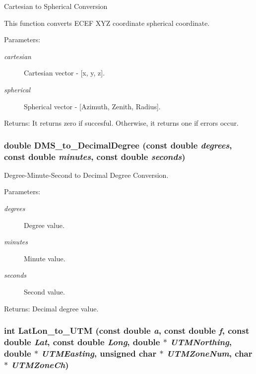 Cartesian to Spherical Conversion 

This function converts ECEF XYZ coordinate spherical coordinate.

\begin{Desc}
\item[Parameters:]
\begin{description}
\item[{\em cartesian}]Cartesian vector - \mbox{[}x, y, z\mbox{]}. \item[{\em spherical}]Spherical vector - \mbox{[}Azimuth, Zenith, Radius\mbox{]}.\end{description}
\end{Desc}
\begin{Desc}
\item[Returns:]It returns zero if succesful. Otherwise, it returns one if errors occur. \end{Desc}
\hypertarget{group__Coordinate_g9e353934d40cb8dc6e102003b945acdd}{
\subsubsection[DMS\_\-to\_\-DecimalDegree]{\setlength{\rightskip}{0pt plus 5cm}double DMS\_\-to\_\-DecimalDegree (const double {\em degrees}, \/  const double {\em minutes}, \/  const double {\em seconds})}}
\label{group__Coordinate_g9e353934d40cb8dc6e102003b945acdd}


Degree-Minute-Second to Decimal Degree Conversion. 

\begin{Desc}
\item[Parameters:]
\begin{description}
\item[{\em degrees}]Degree value. \item[{\em minutes}]Minute value. \item[{\em seconds}]Second value.\end{description}
\end{Desc}
\begin{Desc}
\item[Returns:]Decimal degree value. \end{Desc}
\hypertarget{group__Coordinate_g6c1e48485dd1ac536a1545f7b62c82df}{
\subsubsection[LatLon\_\-to\_\-UTM]{\setlength{\rightskip}{0pt plus 5cm}int LatLon\_\-to\_\-UTM (const double {\em a}, \/  const double {\em f}, \/  const double {\em Lat}, \/  const double {\em Long}, \/  double $\ast$ {\em UTMNorthing}, \/  double $\ast$ {\em UTMEasting}, \/  unsigned char $\ast$ {\em UTMZoneNum}, \/  char $\ast$ {\em UTMZoneCh})}}
\label{group__Coordinate_g6c1e48485dd1ac536a1545f7b62c82df}


